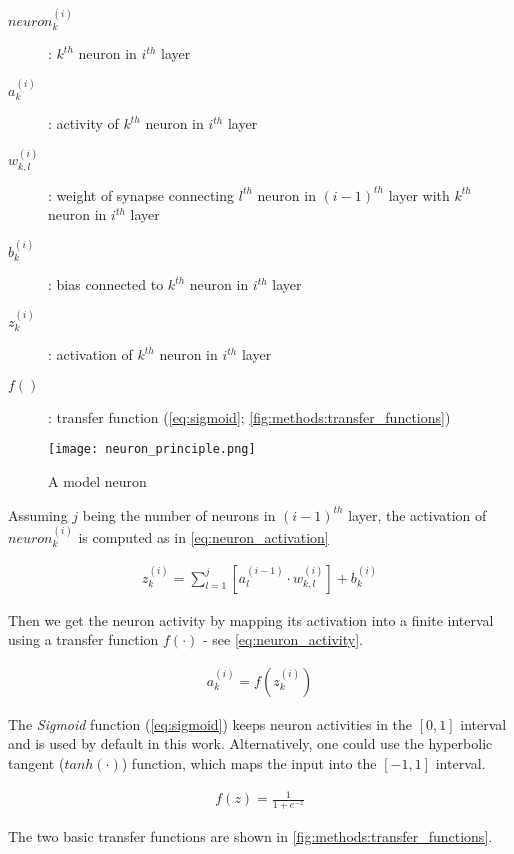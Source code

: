 \begin{description}
\item[$ neuron_k^{(i)} $] : $ k^{th} $ neuron in $ i^{th} $ layer
\item[$ a_k^{(i)} $] : activity of $ k^{th} $ neuron in $ i^{th} $ layer
\item[$ w_{k,l}^{(i)} $] : weight of synapse connecting $ l^{th} $ neuron in $ (i-1)^{th} $ layer with $ k^{th} $ neuron in $ i^{th} $ layer
\item[$ b_k^{(i)} $] : bias connected to $ k^{th} $ neuron in $ i^{th} $ layer
\item[$ z_k^{(i)} $] : activation of $ k^{th} $ neuron in $ i^{th} $ layer
\item[$ f() $] : transfer function (\cref{eq:sigmoid}; \cref{fig:methods:transfer_functions})
\end{description}

\begin{figure}[H]
  \centering
  \texttt{[image: neuron\_principle.png]}
  \caption{A model neuron}
  \label{fig:methods:model_neuron}
\end{figure}

Assuming $ j $ being the number of neurons in $ (i-1)^{th} $ layer, the activation of $ neuron_k^{(i)} $ is computed as in \cref{eq:neuron_activation}

\begin{align} \label{eq:neuron_activation}
z_k^{(i)} = \displaystyle{\sum_{l=1}^{j} [a_l^{(i-1)} \cdot w_{k,l}^{(i)}]} + b_k^{(i)}
\end{align}

Then we get the neuron activity by mapping its activation into a finite interval using a transfer function $ f(\cdot) $ - see \cref{eq:neuron_activity}. 

\begin{align} \label{eq:neuron_activity}
a_k^{(i)} = f(z_k^{(i)})
\end{align}

The \textit{Sigmoid} function (\cref{eq:sigmoid}) keeps neuron activities in the $ [0, 1] $ interval and is used by default in this work. Alternatively, one could use the hyperbolic tangent ($ tanh(\cdot) $) function, which maps the input into the $ [-1, 1] $ interval.

\begin{align} \label{eq:sigmoid}
f(z) = \frac{1}{1 + e^{-z}}
\end{align}

The two basic transfer functions are shown in \cref{fig:methods:transfer_functions}.

